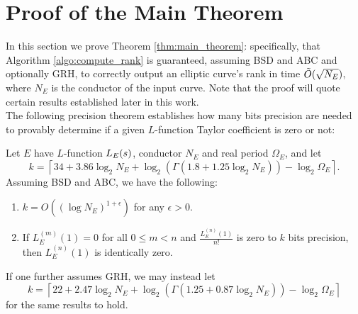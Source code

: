 
\section{Proof of the Main Theorem}\label{sec:main_thrm_proof}

In this section we prove Theorem \ref{thm:main_theorem}: specifically, that Algorithm \ref{algo:compute_rank} is guaranteed, assuming BSD and ABC and optionally GRH, to correctly output an elliptic curve's rank in time $\tilde{O}(\sqrt{N_E})$, where $N_E$ is the conductor of the input curve. Note that the proof will quote certain results established later in this work. \\

The following precision theorem establishes how many bits precision are needed to provably determine if a given $L$-function Taylor coefficient is zero or not:
\begin{theorem}
\label{prop:k_bits_for_leading_coeff}
Let $E$ have $L$-function $L_E(s)$, conductor $N_E$ and real period $\Omega_E$, and let
\begin{equation}\label{eqn:num_bits_without_GRH}
k = \left\lceil 34 + 3.86 \log_2 N_E + \log_2(\Gamma(1.8 + 1.25\log_2 N_E)) - \log_2 \Omega_E \right\rceil.
\end{equation}
Assuming BSD and ABC, we have the following:
\begin{enumerate}
\item $k = O((\log N_E)^{1+\epsilon})$ for any $\epsilon>0$.
\item If $L_E^{(m)}(1)=0$ for all $0 \le m < n$ and $\frac{L_E^{(n)}(1)}{n!}$ is zero to $k$ bits precision, then $L_E^{(n)}(1)$ is identically zero.
\end{enumerate}
\end{theorem}
If one further assumes GRH, we may instead let
\begin{equation}\label{eqn:num_bits_with_GRH}
k = \left\lceil 22 + 2.47 \log_2 N_E + \log_2(\Gamma(1.25 + 0.87 \log_2 N_E)) - \log_2 \Omega_E \right\rceil
\end{equation}
for the same results to hold.
